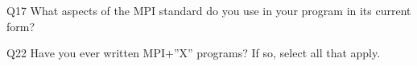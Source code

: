 \begin{description}%
\item{Q17} What aspects of the MPI standard do you use in your program in its current form?%
\item{Q22} Have you ever written MPI+”X” programs? If so, select all that apply.%
\end{description}%
